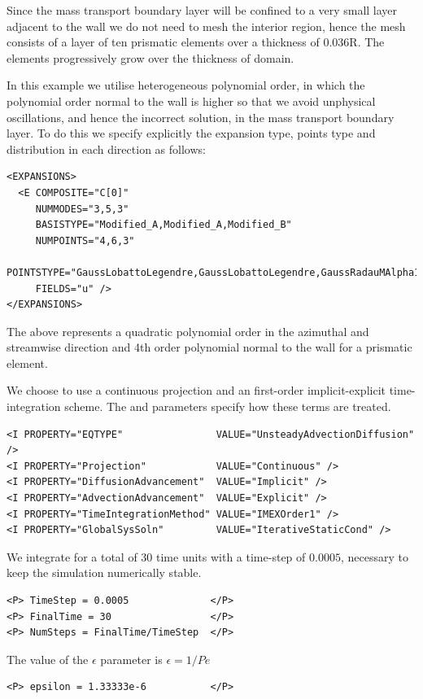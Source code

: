 Since the mass transport boundary layer will be confined to a very small layer
adjacent to the wall we do not need to mesh the interior region, hence the mesh
consists of a layer of ten prismatic elements over a thickness of 0.036R. The
elements progressively grow over the thickness of domain.

In this example we utilise heterogeneous polynomial order, in which the
polynomial order normal to the wall is higher so that we avoid unphysical
oscillations, and hence the incorrect solution, in the mass transport boundary
layer. To do this we specify explicitly the expansion type, points type and
distribution in each direction as follows:
\begin{lstlisting}[style=XMLStyle]
<EXPANSIONS>
  <E COMPOSITE="C[0]"
     NUMMODES="3,5,3"
     BASISTYPE="Modified_A,Modified_A,Modified_B"
     NUMPOINTS="4,6,3"
     POINTSTYPE="GaussLobattoLegendre,GaussLobattoLegendre,GaussRadauMAlpha1Beta0"
     FIELDS="u" />
</EXPANSIONS>
\end{lstlisting}

The above represents a quadratic polynomial order in the azimuthal and
streamwise direction and 4th order polynomial normal to the wall for a prismatic
element.

We choose to use a continuous projection and an first-order implicit-explicit
time-integration scheme. The  and
 parameters specify how these terms are treated.
\begin{lstlisting}[style=XMLStyle]
<I PROPERTY="EQTYPE"                VALUE="UnsteadyAdvectionDiffusion" />
<I PROPERTY="Projection"            VALUE="Continuous" />
<I PROPERTY="DiffusionAdvancement"  VALUE="Implicit" />
<I PROPERTY="AdvectionAdvancement"  VALUE="Explicit" />
<I PROPERTY="TimeIntegrationMethod" VALUE="IMEXOrder1" />
<I PROPERTY="GlobalSysSoln"         VALUE="IterativeStaticCond" />
\end{lstlisting}

We integrate for a total of $30$ time units with a time-step of $0.0005$,
necessary to keep the simulation numerically stable.
\begin{lstlisting}[style=XMLStyle]
<P> TimeStep = 0.0005              </P>
<P> FinalTime = 30                 </P>
<P> NumSteps = FinalTime/TimeStep  </P>
\end{lstlisting}

The value of the $\epsilon$ parameter is $\epsilon = 1/Pe$
\begin{lstlisting}[style=XMLStyle]
<P> epsilon = 1.33333e-6           </P>
\end{lstlisting}


